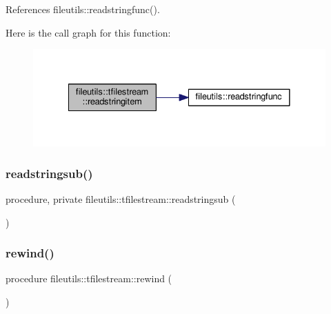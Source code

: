 References fileutils\+::readstringfunc().

Here is the call graph for this function\+:
\nopagebreak
\begin{figure}[H]
\begin{center}
\leavevmode
\includegraphics[width=332pt]{structfileutils_1_1tfilestream_a256bf925db8f74144f916aa3a23f11d9_cgraph}
\end{center}
\end{figure}
\mbox{\label{structfileutils_1_1tfilestream_abca5180b667ad84fca9f1bf4a94c9f3f}} 
\subsubsection{\texorpdfstring{readstringsub()}{readstringsub()}}
{\footnotesize\ttfamily procedure, private fileutils\+::tfilestream\+::readstringsub (\begin{DoxyParamCaption}{ }\end{DoxyParamCaption})\hspace{0.3cm}{\ttfamily [private]}}

\mbox{\label{structfileutils_1_1tfilestream_af669a2d8d5c12fa2723fc68646a921f5}} 
\subsubsection{\texorpdfstring{rewind()}{rewind()}}
{\footnotesize\ttfamily procedure fileutils\+::tfilestream\+::rewind (\begin{DoxyParamCaption}{ }\end{DoxyParamCaption})\hspace{0.3cm}{\ttfamily [private]}}

